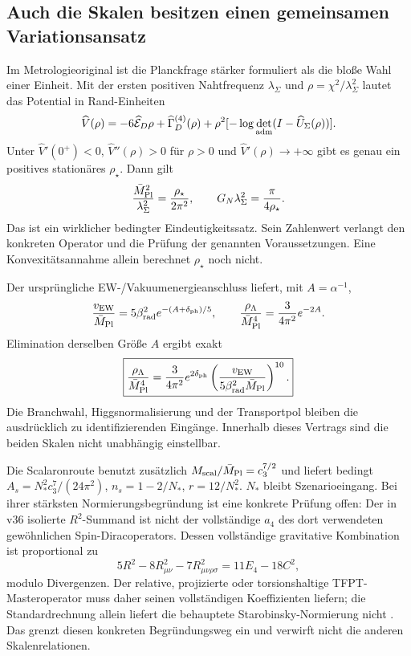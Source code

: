 \subsection{Auch die Skalen besitzen einen gemeinsamen Variationsansatz}
Im Metrologieoriginal ist die Planckfrage stärker formuliert als die bloße Wahl einer Einheit. Mit der ersten positiven Nahtfrequenz $\lambda_\Sigma$ und $\rho=\chi^2/\lambda_\Sigma^2$ lautet das Potential in Rand-Einheiten
\begin{equation}
\widehat V(\rho)=-6\widehat{\mathcal E}_D\rho
+\widehat\Gamma_D^{(4)}(\rho)
+\rho^2[-\log\det_{\rm adm}(I-\widehat U_\Sigma(\rho))].
\end{equation}
Unter $\widehat V'(0^+)<0$, $\widehat V''(\rho)>0$ für $\rho>0$ und $\widehat V'(\rho)\to+\infty$ gibt es genau ein positives stationäres $\rho_\star$. Dann gilt
\begin{equation}
\frac{\bar M_{\rm Pl}^2}{\lambda_\Sigma^2}=\frac{\rho_\star}{2\pi^2},\qquad
G_N\lambda_\Sigma^2=\frac{\pi}{4\rho_\star}.
\end{equation}
Das ist ein wirklicher bedingter Eindeutigkeitssatz. Sein Zahlenwert verlangt den konkreten Operator und die Prüfung der genannten Voraussetzungen. Eine Konvexitätsannahme allein berechnet $\rho_\star$ noch nicht.

Der ursprüngliche EW-/Vakuumenergieanschluss liefert, mit $A=\alpha^{-1}$,
\begin{equation}
\frac{v_{\rm EW}}{\bar M_{\rm Pl}}=5\beta_{\rm rad}^2e^{-(A+\delta_{\rm ph})/5},
\qquad \frac{\rho_\Lambda}{\bar M_{\rm Pl}^4}=\frac3{4\pi^2}e^{-2A}.
\end{equation}
Elimination derselben Größe $A$ ergibt exakt
\begin{equation}\label{eq:physicalscalebridge}
\boxed{\frac{\rho_\Lambda}{\bar M_{\rm Pl}^4}
=\frac3{4\pi^2}e^{2\delta_{\rm ph}}
\left(\frac{v_{\rm EW}}{5\beta_{\rm rad}^2\bar M_{\rm Pl}}\right)^{10}.}
\end{equation}
Die Branchwahl, Higgsnormalisierung und der Transportpol bleiben die ausdrücklich zu identifizierenden Eingänge. Innerhalb dieses Vertrags sind die beiden Skalen nicht unabhängig einstellbar.

Die Scalaronroute benutzt zusätzlich $M_{\rm scal}/\bar M_{\rm Pl}=c_3^{7/2}$ und liefert bedingt $A_s=N_*^2c_3^7/(24\pi^2)$, $n_s=1-2/N_*$, $r=12/N_*^2$. $N_*$ bleibt Szenarioeingang. Bei ihrer stärksten Normierungsbegründung ist eine konkrete Prüfung offen: Der in v36 isolierte $R^2$-Summand ist nicht der vollständige $a_4$ des dort verwendeten gewöhnlichen Spin-Diracoperators. Dessen vollständige gravitative Kombination ist proportional zu
\begin{equation}
5R^2-8R_{\mu\nu}^2-7R_{\mu\nu\rho\sigma}^2=11E_4-18C^2,
\end{equation}
modulo Divergenzen. Der relative, projizierte oder torsionshaltige TFPT-Masteroperator muss daher seinen vollständigen Koeffizienten liefern; die Standardrechnung allein liefert die behauptete Starobinsky-Normierung nicht \cite{chamseddineconnes}. Das grenzt diesen konkreten Begründungsweg ein und verwirft nicht die anderen Skalenrelationen.

